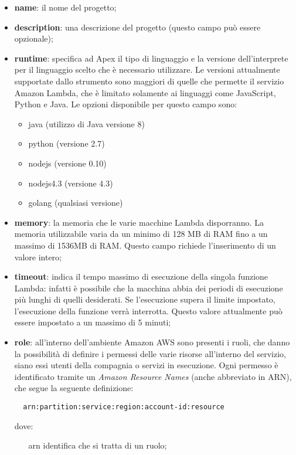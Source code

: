 \begin{itemize}
  \item \textbf{name}: il nome del progetto;
  \item \textbf{description}: una descrizione del progetto (questo campo può
essere opzionale);
  \item \textbf{runtime}: specifica ad Apex il tipo di linguaggio e la versione
dell'interprete per il linguaggio scelto che è necessario utilizzare. Le
versioni attualmente supportate dallo strumento sono maggiori di quelle che
permette il servizio Amazon Lambda, che è limitato solamente ai linguaggi come
JavaScript, Python e Java. Le opzioni disponibile per questo campo sono:
  \begin{itemize}
    \item java (utilizzo di Java versione 8)
    \item python (versione 2.7)
    \item nodejs (versione 0.10)
    \item nodejs4.3 (versione 4.3)
    \item golang (qualsiasi versione)
  \end{itemize}

  \item \textbf{memory}: la memoria che le varie macchine Lambda disporranno.
La memoria utilizzabile varia da un minimo di 128 MB di RAM fino a un massimo
di 1536MB di RAM. Questo campo richiede l'inserimento di un valore intero;

  \item \textbf{timeout}: indica il tempo massimo di esecuzione della singola
funzione Lambda: infatti è possibile che la macchina abbia dei periodi di
esecuzione più lunghi di quelli desiderati. Se l'esecuzione supera il limite
impostato, l'esecuzione della funzione verrà interrotta. Questo valore
attualmente può essere impostato a un massimo di 5 minuti;

  \item \textbf{role}: all'interno dell'ambiente Amazon AWS sono presenti i
ruoli, che danno la possibilità di definire i permessi delle varie risorse
all'interno del servizio, siano essi utenti della compagnia o servizi in
esecuzione. Ogni permesso è identificato tramite un \textit{Amazon Resource
Names} (anche abbreviato in ARN), che segue la seguente definizione:
\begin{verbatim}
  arn:partition:service:region:account-id:resource
\end{verbatim}
dove:
  \begin{itemize}
    \item[arn] identifica che si tratta di un ruolo;


\end{itemize}
\end{itemize}
